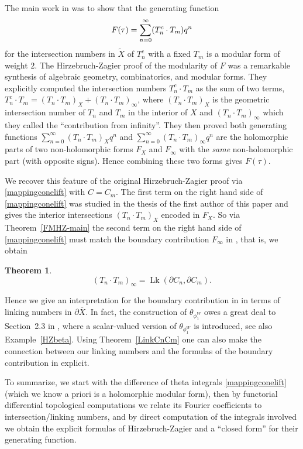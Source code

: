 \documentclass[12pt,leqno]{amsart}
\numberwithin{equation}{section}
\theoremstyle{plain}
\newtheorem{theorem}{Theorem}[section]
\theoremstyle{definition}
\theoremstyle{remark}
\newcommand{\Lk}{\operatorname{Lk}}
\begin{document}
The main work in \cite{HZ} was to show that the generating function
\[\vspace{-.1cm}
F(\tau) = \sum_{n=0}^{\infty} (T_n^c \cdot T_m) q^n \vspace{-.1cm}
\]
for the intersection numbers in $\tilde{X}$ of $T^c_n$ with a fixed $T_m$ is a modular form of weight $2$. The Hirzebruch-Zagier proof of the modularity of $F$ was a remarkable synthesis of algebraic geometry, combinatorics, and modular forms. They explicitly computed the intersection numbers $T_n^c \cdot T_m$ as the sum of two terms, $T_n^c \cdot T_m = (T_n \cdot T_m)_X  + ({T}_n \cdot {T}_m)_{\infty}$, where $(T_n \cdot T_m)_X $ is the geometric intersection number of $T_n$ and $T_m$ in the interior of $X$ and $({T}_n \cdot {T}_m)_{\infty}$ which they called the ``contribution from infinity''. They then proved both generating functions $\sum_{n=0}^{\infty} (T_n \cdot T_m)_X  q^n$ and $\sum_{n=0}^{\infty}  (T_n \cdot T_m)_{\infty} q^n$ are the holomorphic parts of two non-holomorphic forms $F_X$ and $F_{\infty}$ with the {\it same} non-holomorphic part (with opposite signs). Hence combining these two forms gives $F(\tau)$.

We recover this feature of the original Hirzebruch-Zagier proof via \eqref{mappingconelift} with $C=C_m$. The first term on the right hand side of \eqref{mappingconelift} was studied in the thesis of the first author of this paper \cite{FCompo} and gives the interior intersections $(T_n \cdot T_m)_X$ encoded in $F_X$. So via Theorem~\ref{FMHZ-main} the second term on the right hand side of \eqref{mappingconelift} must match the boundary contribution $F_{\infty}$ in \cite{HZ}, that is, we obtain
\begin{theorem}
\[
({T}_n \cdot {T}_m)_{\infty} = \Lk( \partial C_n, \partial C_m).
\]
\end{theorem}
Hence we give an interpretation for the boundary contribution in \cite{HZ} in terms of linking numbers in $\partial \overline{X}$. In fact, the construction of $\theta_{\phi_1^W}$ owes a great deal to Section~2.3 in \cite{HZ}, where a scalar-valued version of $\theta_{\phi_1^W}$ is introduced, see also Example~\ref{HZbeta}. Using Theorem~\ref{LinkCnCm} one can also make the connection between our linking numbers and the formulas of the boundary contribution in \cite{HZ} explicit. 

To summarize, we start with the difference of theta integrals \eqref{mappingconelift} (which we know a priori is a holomorphic modular form), then by functorial differential topological computations we relate its Fourier coefficients to intersection/linking numbers, and by direct computation of the integrals involved we obtain the explicit formulas of Hirzebruch-Zagier and a ``closed form'' for their generating function.
\end{document}
